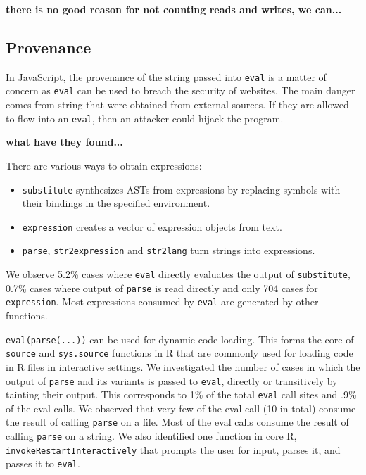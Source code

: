 \documentclass[USenglish,cleveref, autoref, thm-restate]{lipics-v2019}
\newcommand{\PercentParsedEvals}{.9\%\xspace}
\newcommand{\PercentParsedCallSites}{1\%\xspace}
\newcommand{\NbParseFilesRnd}{10\xspace}
\newcommand{\eval}{\texttt{eval}\xspace}
\renewcommand{\c}[1]{\lstinline{#1}\xspace}
\begin{document}
{\bf there is no good reason for not counting reads and writes, we can...}




\subsection{Provenance}

In JavaScript, the provenance of the string passed into \eval is a matter of
concern as \eval can be used to breach the security of websites. The main
danger comes from string that were obtained from external sources. If they
are allowed to flow into an \eval, then an attacker could hijack the
program.

{\bf what have they found...}

There are various ways to obtain expressions:
\begin{itemize}
  \item \c{substitute} synthesizes ASTs from expressions by replacing
    symbols with their bindings in the specified environment.
  \item \c{expression}  creates a vector of expression
    objects from text.
  \item \c{parse}, \c{str2expression} and \c{str2lang} turn strings into
    expressions.
\end{itemize}

We observe 5.2\% cases where \eval directly evaluates the output of
\c{substitute}, 0.7\% cases where output of \c{parse} is read directly and
only 704 cases for \c{expression}. Most expressions consumed by \eval are
generated by other functions.

\c{eval(parse(...))} can be used for dynamic code loading. This forms the
core of \c{source} and \c{sys.source} functions in R that are commonly used
for loading code in R files in interactive settings. We investigated the
number of cases in which the output of \c{parse} and its variants is passed
to \eval, directly or transitively by tainting their output. This
corresponds to \PercentParsedCallSites of the total \eval call sites and
\PercentParsedEvals of the eval calls. We observed that very few of the eval
call (\NbParseFilesRnd in total) consume the result of calling \c{parse} on
a file. Most of the eval calls consume the result of calling \c{parse} on a
string.  We also identified one function in core R,
\c{invokeRestartInteractively} that prompts the user for input, parses it,
and passes it to \eval.
\end{document}
